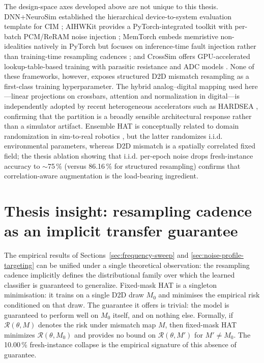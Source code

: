 The design-space axes developed above are not unique to this thesis. DNN+NeuroSim established the hierarchical device-to-system evaluation template for CIM \citep{peng2020dnnneurosim}; AIHWKit provides a PyTorch-integrated toolkit with per-batch PCM/ReRAM noise injection \citep{rasch2021aihwkit}; MemTorch embeds memristive non-idealities natively in PyTorch but focuses on inference-time fault injection rather than training-time resampling cadences \citep{lammie2022memtorch}; and CrossSim offers GPU-accelerated lookup-table-based training with parasitic resistance and ADC models \citep{crosssim2026}. None of these frameworks, however, exposes structured D2D mismatch resampling as a first-class training hyperparameter. The hybrid analog--digital mapping used here---linear projections on crossbars, attention and normalization in digital---is independently adopted by recent heterogeneous accelerators such as HARDSEA \citep{lin2024hardsea}, confirming that the partition is a broadly sensible architectural response rather than a simulator artifact. Ensemble HAT is conceptually related to domain randomization in sim-to-real robotics \citep{tobin2017domain}, but the latter randomizes i.i.d. environmental parameters, whereas D2D mismatch is a spatially correlated fixed field; the thesis ablation showing that i.i.d. per-epoch noise drops fresh-instance accuracy to $\sim$75\,\% (versus 86.16\,\% for structured resampling) confirms that correlation-aware augmentation is the load-bearing ingredient.

\section{Thesis insight: resampling cadence as an implicit transfer guarantee}
\label{sec:cadence-transfer-guarantee}

The empirical results of Sections~\ref{sec:frequency-sweep} and \ref{sec:noise-profile-targeting} can be unified under a single theoretical observation: the resampling cadence implicitly defines the distributional family over which the learned classifier is guaranteed to generalize.  Fixed-mask HAT is a singleton minimisation: it trains on a single D2D draw $M_{0}$ and minimises the empirical risk conditioned on that draw. The guarantee it offers is trivial: the model is guaranteed to perform well on $M_{0}$ itself, and on nothing else. Formally, if $\mathcal{R}(\theta,M)$ denotes the risk under mismatch map $M$, then fixed-mask HAT minimizes $\mathcal{R}(\theta,M_{0})$ and provides no bound on $\mathcal{R}(\theta,M')$ for $M'\neq M_{0}$. The 10.00\,\% fresh-instance collapse is the empirical signature of this absence of guarantee.

